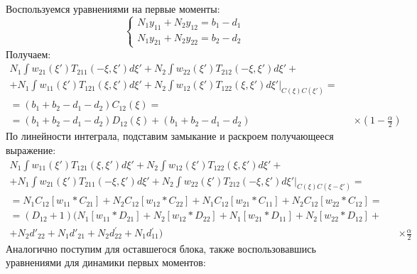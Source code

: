 Воспользуемся уравнениями на первые моменты:
\begin{equation*}
\begin{cases}
N_{1}y_{11}+N_{2}y_{12}=b_{1}-d_{1}\\
N_{1}y_{21}+N_{2}y_{22}=b_{2}-d_{2}
\end{cases}
\end{equation*}
Получаем:
\begin{align*}
N_{1}\int w_{21}(\xi')T_{211}(-\xi,\xi')d\xi'+N_{2}\int w_{22}(\xi')T_{212}(-\xi,\xi')d\xi'+		\\
+N_{1}\int w_{11}(\xi')T_{121}(\xi,\xi')d\xi'+N_{2}\int w_{12}(\xi')T_{122}(\xi,\xi')d\xi'	|_{C(\xi)C(\xi')}=	\\
=(b_{1}+b_{2}-d_{1}-d_{2})C_{12}(\xi)	=	\\
=(b_{1}+b_{2}-d_{1}-d_{2})D_{12}(\xi)+(b_{1}+b_{2}-d_{1}-d_{2}) &&		\times(1-\frac{\alpha}{2})
\end{align*}
По линейности интеграла, подставим замыкание и раскроем получающееся выражение:
\begin{align*}
N_{1}\int w_{11}(\xi')T_{121}(\xi,\xi')d\xi'+N_{2}\int w_{12}(\xi')T_{122}(\xi,\xi')d\xi'+		\\
+N_{1}\int w_{21}(\xi')T_{211}(-\xi,\xi')d\xi'+N_{2}\int w_{22}(\xi')T_{212}(-\xi,\xi')d\xi'|_{C(\xi)C(\xi-\xi')}	=	\\
=N_{1}C_{12}[w_{11}*C_{21}]+N_{2}C_{12}[w_{12}*C_{22}]+N_{1}C_{12}[w_{21}*C_{11}]+N_{2}C_{12}[w_{22}*C_{12}]	= \\	
=(D_{12}+1)(N_{1}[w_{11}*D_{21}]+N_{2}[w_{12}*D_{22}]+N_{1}[w_{21}*D_{11}]+N_{2}[w_{22}*D_{12}]+ \\		
+N_{2}d'_{22}+N_{1}d'_{21}+N_{2}d_{22}^{'}+N_{1}d{}_{11}^{'})		&& \times\frac{\alpha}{2}
\end{align*}
Аналогично поступим для оставшегося блока, также воспользовавшись уравнениями для динамики первых моментов:
